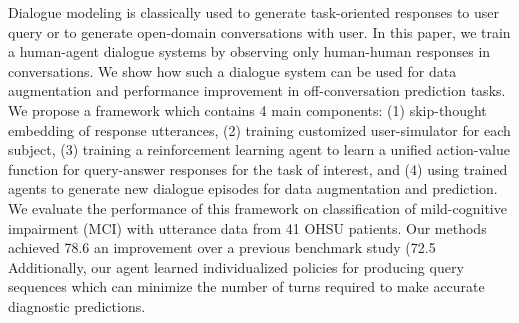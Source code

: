 
Dialogue modeling is classically used to generate task-oriented responses to user 
query or to generate open-domain conversations with user. In this paper, we train a human-agent dialogue systems 
by observing only human-human responses in conversations. We show how such a dialogue system can be used for 
data augmentation and performance improvement in off-conversation prediction tasks. 
We propose a framework which contains 4 main components: (1) skip-thought embedding of response utterances, 
(2) training customized user-simulator for each subject, 
(3) training a reinforcement learning agent to learn a unified action-value function for 
query-answer responses for the task of interest, and 
(4) using trained agents to generate new dialogue episodes for data augmentation and prediction. 
We evaluate the performance of this framework on classification of mild-cognitive impairment 
(MCI) with utterance data from 41 OHSU patients. 
Our methods achieved 78.6%
an improvement over a previous benchmark study (72.5%
Additionally, our agent learned individualized policies for producing query 
sequences which can minimize the number of turns required to make accurate diagnostic predictions.
